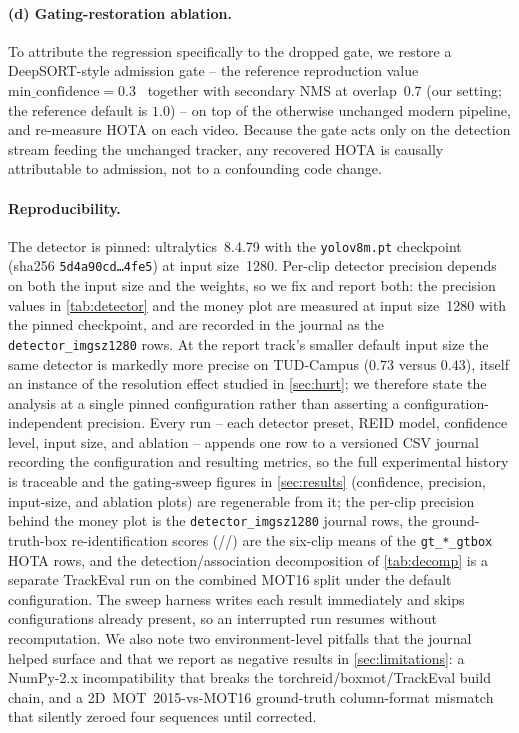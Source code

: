 \paragraph{(d) Gating-restoration ablation.}
To attribute the regression specifically to the dropped gate, we restore a DeepSORT-style admission
gate -- the reference reproduction value $\text{min\_confidence}=0.3$~\cite{wojke2017deepsortcode}
together with secondary NMS at overlap~$0.7$ (our setting; the reference default is $1.0$) -- on top of
the otherwise unchanged modern pipeline, and re-measure HOTA on each video. Because the gate acts only
on the detection stream feeding the unchanged tracker, any recovered HOTA is causally attributable to
admission, not to a confounding code change.

\paragraph{Reproducibility.}
The detector is pinned: ultralytics~8.4.79 with the \texttt{yolov8m.pt} checkpoint
(sha256 \texttt{5d4a90cd\dots4fe5}) at input size~1280. Per-clip detector precision depends on both the
input size and the weights, so we fix and report both: the precision values in \cref{tab:detector} and
the money plot are measured at input size~1280 with the pinned checkpoint, and are recorded in the
journal as the \texttt{detector\_imgsz1280} rows. At the report track's smaller default input size the
same detector is markedly more precise on TUD-Campus ($0.73$ versus $0.43$), itself an instance of the
resolution effect studied in \cref{sec:hurt}; we therefore state the analysis at a single pinned
configuration rather than asserting a configuration-independent precision.
Every run -- each detector preset, REID model, confidence level, input size, and ablation -- appends
one row to a versioned CSV journal recording the configuration and resulting metrics, so the full
experimental history is traceable and the gating-sweep figures in \cref{sec:results} (confidence,
precision, input-size, and ablation plots) are regenerable from it; the per-clip precision behind the
money plot is the \texttt{detector\_imgsz1280} journal rows, the ground-truth-box re-identification
scores (\osnetGT{}/\timmGT{}/\osnetainGT{}) are the six-clip means of the \texttt{gt\_*\_gtbox} HOTA
rows, and the detection/association decomposition of \cref{tab:decomp} is a separate TrackEval run on
the combined MOT16 split under the default configuration. The
sweep harness writes each result immediately and skips configurations already present, so an
interrupted run resumes without recomputation. We also note two environment-level pitfalls that the
journal helped surface and that we report as negative results in \cref{sec:limitations}: a NumPy-2.x
incompatibility that breaks the torchreid/boxmot/TrackEval build chain, and a 2D~MOT~2015-vs-MOT16
ground-truth column-format mismatch that silently zeroed four sequences until corrected.
